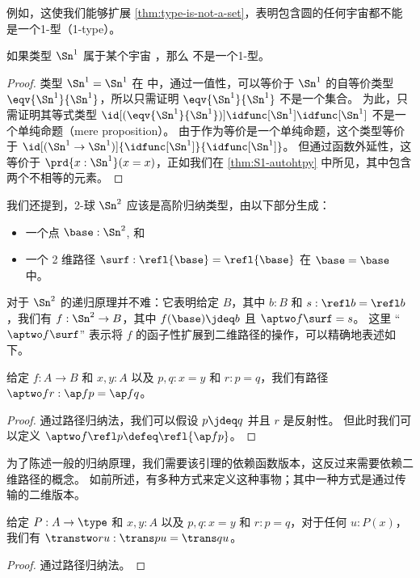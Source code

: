 例如，这使我们能够扩展 \cref{thm:type-is-not-a-set}，表明包含圆的任何宇宙都不能是一个1-型（1-type）。

\begin{cor}
  如果类型 $\Sn^1$ 属于某个宇宙 \type，那么 \type 不是一个1-型。
\end{cor}
\begin{proof}
  类型 $\Sn^1=\Sn^1$ 在 \type 中，通过一值性，可以等价于 $\Sn^1$ 的自等价类型 $\eqv{\Sn^1}{\Sn^1}$，所以只需证明 $\eqv{\Sn^1}{\Sn^1}$ 不是一个集合。
  为此，只需证明其等式类型 $\id[(\eqv{\Sn^1}{\Sn^1})]{\idfunc[\Sn^1]}{\idfunc[\Sn^1]}$ 不是一个单纯命题（mere proposition）。
  由于作为等价是一个单纯命题，这个类型等价于 $\id[(\Sn^1\to\Sn^1)]{\idfunc[\Sn^1]}{\idfunc[\Sn^1]}$。
  但通过函数外延性，这等价于 $\prd{x:\Sn^1} (x=x)$，正如我们在 \cref{thm:S1-autohtpy} 中所见，其中包含两个不相等的元素。
\end{proof}

%

%
%
我们还提到，2-球 $\Sn^2$ 应该是高阶归纳类型，由以下部分生成：
\begin{itemize}
  \item 一个点 $\base:\Sn^2$, 和
  \item 一个 2 维路径 $\surf:\refl{\base} = \refl{\base}$ 在 ${\base=\base}$ 中。
\end{itemize}
%
对于 $\Sn^2$ 的递归原理并不难：它表明给定 $B$，其中 $b:B$ 和 $s:\refl b = \refl b$，我们有 $f:\Sn^2\to B$，其中 $f(\base)\jdeq b$ 且 $\aptwo f \surf = s$。
这里 ``$\aptwo f \surf$'' 表示将 $f$ 的函子性扩展到二维路径的操作，可以精确地表述如下。

\begin{lem}\label{thm:ap2}
给定 $f:A\to B$ 和 $x,y:A$ 以及 $p,q:x=y$ 和 $r:p=q$，我们有路径 $\aptwo f r : \ap f p = \ap f q$。
\end{lem}
\begin{proof}
  通过路径归纳法，我们可以假设 $p\jdeq q$ 并且 $r$ 是反射性。
  但此时我们可以定义 $\aptwo f {\refl p} \defeq \refl{\ap f p}$。
\end{proof}

为了陈述一般的归纳原理，我们需要该引理的依赖函数版本，这反过来需要依赖二维路径的概念。
如前所述，有多种方式来定义这种事物；其中一种方式是通过传输的二维版本。

\begin{lem}\label{thm:transport2}
给定 $P:A\to\type$ 和 $x,y:A$ 以及 $p,q:x=y$ 和 $r:p=q$，对于任何 $u:P(x)$，我们有 $\transtwo r u : \trans p u = \trans q u$。
\end{lem}
\begin{proof}
  通过路径归纳法。
\end{proof}

